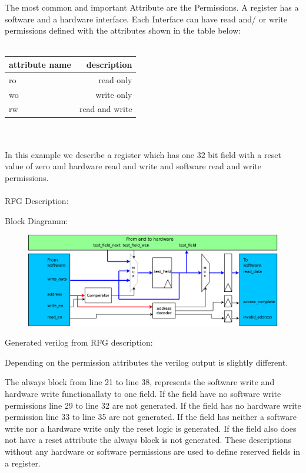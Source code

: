 \documentclass[12pt,a4paper]{article}
\begin{document}
The most common and important Attribute are the Permissions. A register has a software and a hardware interface. Each Interface can have read and/ or write permissions defined with the attributes shown in the table below:\\
\\
\begin{tabular}{ l | r }
attribute name & description \\ \hline
ro & read only \\ \hline
wo & write only \\ \hline
rw & read and write \\ \hline
\end{tabular}
\\
\\
In this example we describe a register which has one 32 bit field with a reset value of zero and hardware read and write and software read and write permissions.\\
\\
RFG Description:


Block Diagramm:
\begin{figure}[h!]
\includegraphics[width=\textwidth]{pictures/Reg_hrw_srw_hwen.png}
\end{figure}
\newpage
Generated verilog from RFG description:

Depending on the permission attributes the verilog output is slightly different. 

The always block from line 21 to line 38, represents the software write and hardware write functionallaty to one field. If the field have no software write permissions line 29 to line 32 are not generated. If the field has no hardware write permission line 33 to line 35 are not generated. If the field has neither a software write nor a hardware write only the reset logic is generated. If the field also does not have a reset attribute the always block is not generated. These descriptions without any hardware or software permissions are used to define reserved fields in a register.
\end{document}
